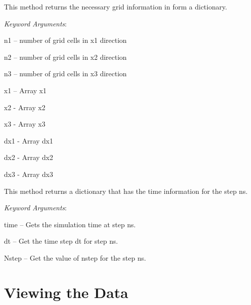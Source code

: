 \documentclass[letterpaper,10pt,english]{sphinxmanual}
\begin{document}
\begin{fulllineitems}

\begin{fulllineitems}
\label{pload:pyPLUTO.pload.grid}
This method returns the necessary grid information in form a dictionary.

\emph{Keyword Arguments}:

n1 -- number of grid cells in x1 direction

n2 -- number of grid cells in x2 direction

n3 -- number of grid cells in x3 direction

x1 -- Array x1

x2 - Array x2

x3 - Array x3

dx1 - Array dx1

dx2 - Array dx2

dx3 - Array dx3

\end{fulllineitems}


\begin{fulllineitems}
\label{pload:pyPLUTO.pload.time_info}
This method returns a dictionary that has the time information for the
step ns.

\emph{Keyword Arguments}:

time -- Gets the simulation time at step ns.

dt -- Get the time step dt for step ns.

Nstep -- Get the value of nstep for the step ns.

\end{fulllineitems}


\end{fulllineitems}



\section{Viewing the Data}
\label{image:viewing-the-data}\label{image::doc}
\end{document}
